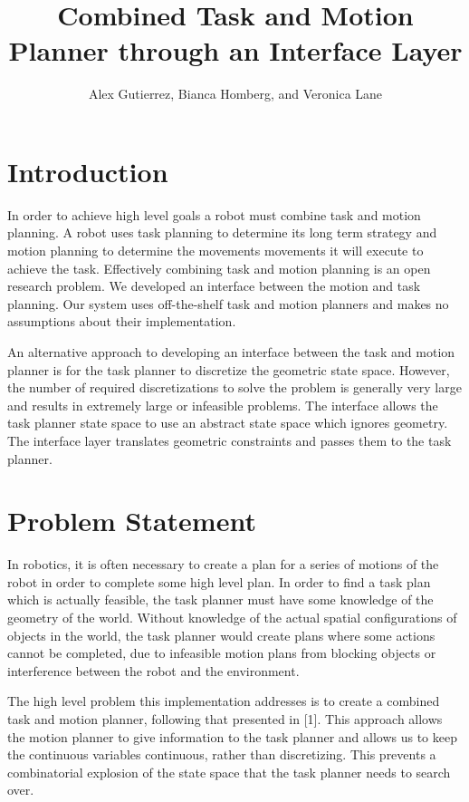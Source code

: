 \documentclass[12pt]{article}
\title{Combined Task and Motion Planner through an Interface Layer}
\author{Alex Gutierrez, Bianca Homberg, and Veronica Lane}
\begin{document}
\maketitle

\section{Introduction}

In order to achieve high level goals a robot must combine task and motion planning. 
A robot uses task planning to determine its long term strategy and motion planning to determine the movements movements it  will execute to achieve the task. 
Effectively combining task and motion planning is an open research problem. 
We developed an interface between the motion and task planning. 
Our system uses off-the-shelf task and motion planners and makes no assumptions about their implementation.
 
An alternative approach to developing an interface between the task and motion planner is for the task planner to discretize the geometric state space. 
However, the number of required discretizations to solve the problem is generally very large and results in extremely large or infeasible problems. 
The interface allows the task planner state space to use an abstract state space which ignores geometry. 
The interface layer translates geometric constraints and passes them to the task planner.

\section{Problem Statement}

In robotics, it is often necessary to create a plan for a series of motions of the robot in order to complete some high level plan.
In order to find a task plan which is actually feasible, the task planner must have some knowledge of the geometry of the world.
Without knowledge of the actual spatial configurations of objects in the world, the task planner would create plans where some actions cannot be completed, due to infeasible motion plans from blocking objects or interference between the robot and the environment.

The high level problem this implementation addresses is to create a combined task and motion planner, following that presented in [1].  
This approach allows the motion planner to give information to the task planner and allows us to keep the continuous variables continuous, rather than discretizing.  
This prevents a combinatorial explosion of the state space that the task planner needs to search over.
\end{document}
